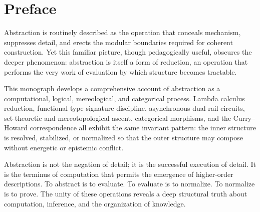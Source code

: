 \documentclass[12pt,letterpaper]{article}
\theoremstyle{remark}
\begin{document}
\begin{abstract}
The revised master formula is:
\[
\text{Valid abstraction}
\text{reduction}
+
\text{admissibility preservation}
+
\text{memory residue}
+
\text{repairable reachability.}
\]

The resulting picture is a computational ethics of abstraction: not merely
\emph{to abstract is to reduce}, but \emph{abstraction is reduction only
when the collapse preserves the conditions for future reconstruction}.  A
valid abstraction produces not just a value but a system: a value, its
production history, its reachability guarantee, and its merge conditions.
The question is not merely what is reduced but whether the reduction leaves
the world in a state from which the reduced content can be recovered,
repaired, or renegotiated.
\end{abstract}


\newpage

\tableofcontents
\newpage

\section{Preface}

Abstraction is routinely described as the operation that conceals mechanism, suppresses detail, and erects the modular boundaries required for coherent construction. Yet this familiar picture, though pedagogically useful, obscures the deeper phenomenon: abstraction is itself a form of reduction, an operation that performs the very work of evaluation by which structure becomes tractable.

This monograph develops a comprehensive account of abstraction as a computational, logical, mereological, and categorical process. Lambda calculus reduction, functional type-signature discipline, asynchronous dual-rail circuits, set-theoretic and mereotopological ascent, categorical morphisms, and the Curry--Howard correspondence all exhibit the same invariant pattern: the inner structure is resolved, stabilized, or normalized so that the outer structure may compose without energetic or epistemic conflict. 

Abstraction is not the negation of detail; it is the successful execution of detail. It is the terminus of computation that permits the emergence of higher-order descriptions. To abstract is to evaluate. To evaluate is to normalize. To normalize is to prove. The unity of these operations reveals a deep structural truth about computation, inference, and the organization of knowledge.

\end{document}
